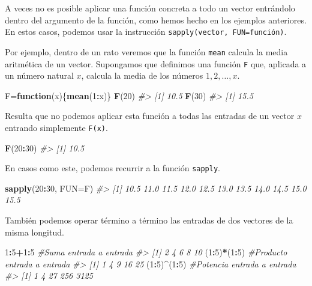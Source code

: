 \documentclass[
]{book}
\newenvironment{Shaded}{\begin{snugshade}}{\end{snugshade}}
\newcommand{\CommentTok}[1]{\textcolor[rgb]{0.56,0.35,0.01}{\textit{#1}}}
\newcommand{\ControlFlowTok}[1]{\textcolor[rgb]{0.13,0.29,0.53}{\textbf{#1}}}
\newcommand{\DataTypeTok}[1]{\textcolor[rgb]{0.13,0.29,0.53}{#1}}
\newcommand{\DecValTok}[1]{\textcolor[rgb]{0.00,0.00,0.81}{#1}}
\newcommand{\KeywordTok}[1]{\textcolor[rgb]{0.13,0.29,0.53}{\textbf{#1}}}
\newcommand{\NormalTok}[1]{#1}
\newcommand{\OperatorTok}[1]{\textcolor[rgb]{0.81,0.36,0.00}{\textbf{#1}}}
\theoremstyle{definition}
\theoremstyle{definition}
\theoremstyle{definition}
\theoremstyle{remark}
\begin{document}
A veces no es posible aplicar una función concreta a todo un vector entrándolo dentro del argumento de la función, como hemos hecho en los ejemplos anteriores. En estos casos, podemos usar la instrucción \texttt{sapply(vector,\ FUN=función)}.

Por ejemplo, dentro de un rato veremos que la función \texttt{mean} calcula la media aritmética de un vector. Supongamos que definimos una función \texttt{F} que, aplicada a un número natural \(x\), calcula la media de los números
\(1,2,\ldots,x\).

\begin{Shaded}
\begin{Highlighting}[]
\NormalTok{F=}\ControlFlowTok{function}\NormalTok{(x)\{}\KeywordTok{mean}\NormalTok{(}\DecValTok{1}\OperatorTok{:}\NormalTok{x)\}}
\KeywordTok{F}\NormalTok{(}\DecValTok{20}\NormalTok{)}
\CommentTok{\#\textgreater{} [1] 10.5}
\KeywordTok{F}\NormalTok{(}\DecValTok{30}\NormalTok{)}
\CommentTok{\#\textgreater{} [1] 15.5}
\end{Highlighting}
\end{Shaded}

Resulta que no podemos aplicar esta función a todas las entradas de un vector \(x\) entrando simplemente \texttt{F(x)}.

\begin{Shaded}
\begin{Highlighting}[]
\KeywordTok{F}\NormalTok{(}\DecValTok{20}\OperatorTok{:}\DecValTok{30}\NormalTok{)}
\CommentTok{\#\textgreater{} [1] 10.5}
\end{Highlighting}
\end{Shaded}

En casos como este, podemos recurrir a la función \texttt{sapply}.

\begin{Shaded}
\begin{Highlighting}[]
\KeywordTok{sapply}\NormalTok{(}\DecValTok{20}\OperatorTok{:}\DecValTok{30}\NormalTok{, }\DataTypeTok{FUN=}\NormalTok{F)}
\CommentTok{\#\textgreater{}  [1] 10.5 11.0 11.5 12.0 12.5 13.0 13.5 14.0 14.5 15.0 15.5}
\end{Highlighting}
\end{Shaded}

También podemos operar término a término las entradas de dos vectores de la misma longitud.

\begin{Shaded}
\begin{Highlighting}[]
\DecValTok{1}\OperatorTok{:}\DecValTok{5}\OperatorTok{+}\DecValTok{1}\OperatorTok{:}\DecValTok{5} \CommentTok{\#Suma entrada a entrada}
\CommentTok{\#\textgreater{} [1]  2  4  6  8 10}
\NormalTok{(}\DecValTok{1}\OperatorTok{:}\DecValTok{5}\NormalTok{)}\OperatorTok{*}\NormalTok{(}\DecValTok{1}\OperatorTok{:}\DecValTok{5}\NormalTok{) }\CommentTok{\#Producto entrada a entrada}
\CommentTok{\#\textgreater{} [1]  1  4  9 16 25}
\NormalTok{(}\DecValTok{1}\OperatorTok{:}\DecValTok{5}\NormalTok{)}\OperatorTok{\^{}}\NormalTok{(}\DecValTok{1}\OperatorTok{:}\DecValTok{5}\NormalTok{) }\CommentTok{\#Potencia entrada a entrada}
\CommentTok{\#\textgreater{} [1]    1    4   27  256 3125}
\end{Highlighting}
\end{Shaded}
\end{document}
